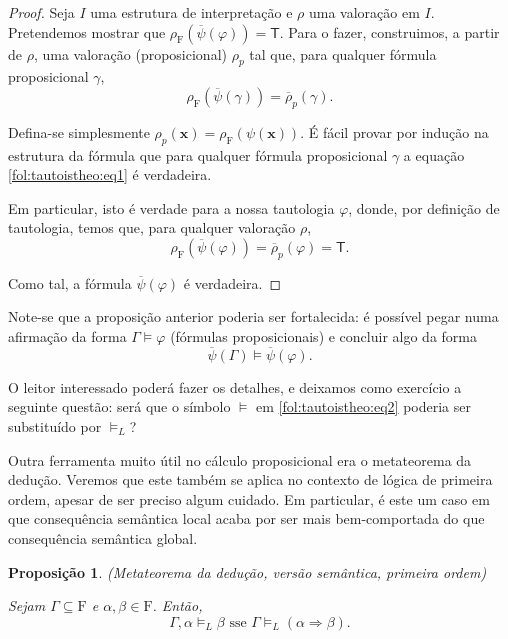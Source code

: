 \documentclass{report}
\newtheorem{prop}{Proposição}
\theoremstyle{definition}
\theoremstyle{remark}
\renewcommand{\bf}[1]{\mathbf{#1}}
\newcommand{\F}{\mathrm{F}}
\newcommand{\lt}{\mathsf{T}}
\newcommand{\imply}{\mathbin{\Rightarrow}}
\begin{document}
	\begin{proof}
	Seja $I$ uma estrutura de interpretação e $\rho$ uma valoração em $I$. Pretendemos mostrar que $\rho_\F(\overline\psi(\varphi)) = \lt$. Para o fazer, construimos, a partir de $\rho$, uma valoração (proposicional) $\rho_p$ tal que, para qualquer fórmula proposicional $\gamma$,
	\begin{equation}\label{fol:tautoistheo:eq1}
	\rho_\F(\overline\psi(\gamma)) = \overline \rho_p (\gamma).
	\end{equation}
	
	Defina-se simplesmente $\rho_p(\bf x) = \rho_\F(\psi(\bf x))$. É fácil provar por indução na estrutura da fórmula que para qualquer fórmula proposicional $\gamma$ a equação \eqref{fol:tautoistheo:eq1} é verdadeira.
	
	Em particular, isto é verdade para a nossa tautologia $\varphi$, donde, por definição de tautologia, temos que, para qualquer valoração $\rho$,
	\[\rho_\F(\overline\psi(\varphi)) = \overline \rho_p (\varphi) = \lt.\]
	
	Como tal, a fórmula $\overline\psi(\varphi)$ é verdadeira.
	\end{proof}
	
	Note-se que a proposição anterior poderia ser fortalecida: é possível pegar numa afirmação da forma $\Gamma \vDash \varphi$ (fórmulas proposicionais) e concluir algo da forma
	\begin{equation}\label{fol:tautoistheo:eq2}
	\overline\psi(\Gamma) \vDash \overline\psi(\varphi).
	\end{equation}
	
	O leitor interessado poderá fazer os detalhes, e deixamos como exercício a seguinte questão: será que o símbolo $\vDash$ em \eqref{fol:tautoistheo:eq2} poderia ser substituído por $\vDash_L$?
	
	\smallskip
	
	Outra ferramenta muito útil no cálculo proposicional era o metateorema da dedução. Veremos que este também se aplica no contexto de lógica de primeira ordem, apesar de ser preciso algum cuidado. Em particular, é este um caso em que consequência semântica local acaba por ser mais bem-comportada do que consequência semântica global.
	
	\begin{prop}(Metateorema da dedução, versão semântica, primeira ordem)
	
	Sejam $\Gamma \subseteq \F$ e $\alpha, \beta \in \F$. Então,
	\[\Gamma, \alpha \vDash_L \beta \text{ sse } \Gamma \vDash_L (\alpha \imply \beta).\]
	\end{prop}
	
\end{document}
